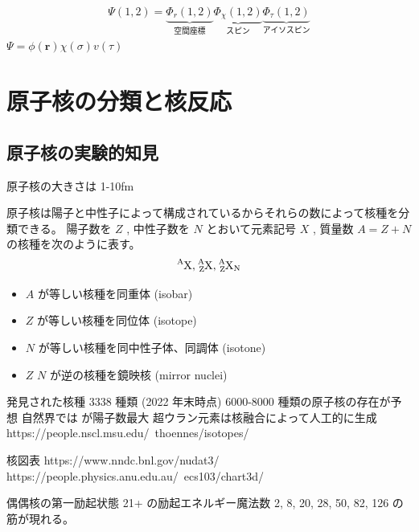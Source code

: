 \documentclass[uplatex,dvipdfmx,a4paper,11pt]{jlreq}
\newcommand{\rr}{\bm{r}}
\numberwithin{equation}{section}
\theoremstyle{definition}
\begin{document}
\begin{align}
  \Psi(1, 2) = \underbrace{\Phi_r(1, 2)}_{空間座標}\underbrace{\Phi_\chi(1, 2)}_{スピン}\underbrace{\Phi_\tau(1, 2)}_{アイソスピン}
\end{align}
$\Psi = \phi(\rr)\chi(\sigma)v(\tau)$


\section{原子核の分類と核反応}
\subsection{原子核の実験的知見}
原子核の大きさは 1-10fm

原子核は陽子と中性子によって構成されているからそれらの数によって核種を分類できる。
陽子数を $Z$ , 中性子数を $N$ とおいて元素記号 $X$ , 質量数 $A = Z + N$ の核種を次のように表す。
\begin{align}
  \ce{^AX}, \ce{^A_ZX}, \ce{^A_ZX_N}
\end{align}
\begin{itemize}
  \item $A$ が等しい核種を同重体 (isobar)
  \item $Z$ が等しい核種を同位体 (isotope)
  \item $N$ が等しい核種を同中性子体、同調体 (isotone)
  \item $Z$ $N$ が逆の核種を鏡映核 (mirror nuclei)
\end{itemize}

発見された核種 3338 種類 (2022 年末時点)
6000-8000 種類の原子核の存在が予想
自然界では  が陽子数最大
超ウラン元素は核融合によって人工的に生成
https://people.nscl.msu.edu/~thoennes/isotopes/

核図表
https://www.nndc.bnl.gov/nudat3/
https://people.physics.anu.edu.au/~ecs103/chart3d/

偶偶核の第一励起状態 21+ の励起エネルギー魔法数 2, 8, 20, 28, 50, 82, 126 の筋が現れる。
\end{document}
